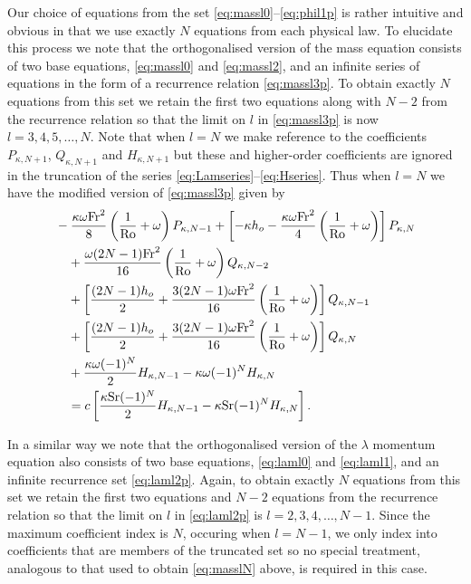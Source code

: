 Our choice of equations from the set \eqref{eq:massl0}--\eqref{eq:phil1p} is rather intuitive and obvious in that we use exactly $N$ equations from each physical law. To elucidate this process we note that the orthogonalised version of the mass equation consists of two base equations, \eqref{eq:massl0} and \eqref{eq:massl2}, and an infinite series of equations in the form of a recurrence relation \eqref{eq:massl3p}. To obtain exactly $N$ equations from this set we retain the first two equations along with $N-2$ from the recurrence relation so that the limit on $l$ in \eqref{eq:massl3p} is now $l=3,4,5,\ldots,N$. Note that when $l=N$ we make reference to the coefficients $P_{\kappa,N+1}$, $Q_{\kappa,N+1}$ and $H_{\kappa,N+1}$ but these and higher-order coefficients are ignored in the truncation of the series \eqref{eq:Lamseries}--\eqref{eq:Hseries}. Thus when $l=N$ we have the modified version of \eqref{eq:massl3p} given by
\begin{align}
&-\frac{\kappa \omega \mathrm{Fr}^2}{8}\left( \frac{1}{\mathrm{Ro}}+\omega \right)P_{\kappa,N-1} + \left[-\kappa h_o -\frac{\kappa \omega \mathrm{Fr}^2}{4}\left( \frac{1}{\mathrm{Ro}}+\omega \right)\right] P_{\kappa,N} \notag \\
&\quad+\frac{\omega (2N-1)\mathrm{Fr}^2}{16}\left( \frac{1}{\mathrm{Ro}}+\omega \right)Q_{\kappa,N-2} \notag\\
&\quad+ \left[\frac{(2N-1) h_o}{2} +\frac{3(2N-1)\omega \mathrm{Fr}^2}{16}\left( \frac{1}{\mathrm{Ro}}+\omega \right)\right] Q_{\kappa,N-1} \notag \\
&\quad+\left[\frac{(2N-1) h_o}{2}+\frac{3(2N-1)\omega \mathrm{Fr}^2}{16}\left( \frac{1}{\mathrm{Ro}}+\omega \right)\right] Q_{\kappa,N} \notag \\
&\quad+\frac{\kappa \omega (-1)^N}{2}H_{\kappa,N-1}-\kappa \omega (-1)^N H_{\kappa,N}\notag \\
&\quad=c\left[\frac{\kappa \mathrm{Sr}(-1)^N}{2} H_{\kappa,N-1}-\kappa \mathrm{Sr}(-1)^N H_{\kappa,N} \right]. \label{eq:masslN}
\end{align}

In a similar way we note that the orthogonalised version of the $\lambda$ momentum equation also consists of two base equations, \eqref{eq:laml0} and \eqref{eq:laml1}, and an infinite recurrence set \eqref{eq:laml2p}. Again, to obtain exactly $N$ equations from this set we retain the first two equations and $N-2$ equations from the recurrence relation so that the limit on $l$ in \eqref{eq:laml2p} is $l=2,3,4,\ldots,N-1$. Since the maximum coefficient index is $N$, occuring when $l=N-1$, we only index into coefficients that are members of the truncated set so no special treatment, analogous to that used to obtain \eqref{eq:masslN} above, is required in this case.

